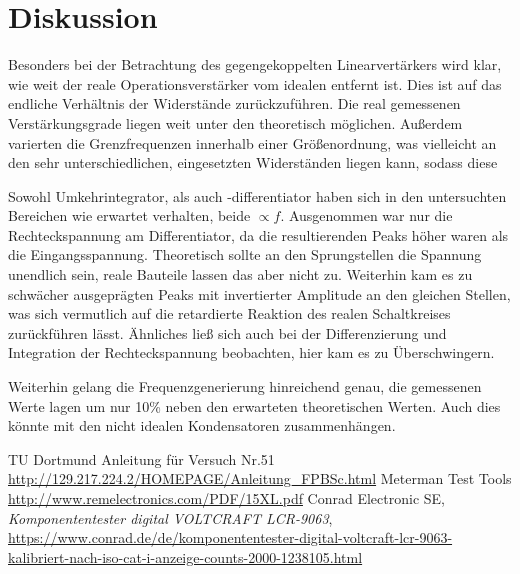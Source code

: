 \section{Diskussion}
Besonders bei der Betrachtung des gegengekoppelten Linearvertärkers wird klar, wie weit der reale Operationsverstärker vom idealen entfernt ist. Dies ist auf das endliche Verhältnis der Widerstände zurückzuführen. Die real gemessenen Verstärkungsgrade liegen weit unter den theoretisch möglichen. Außerdem varierten die Grenzfrequenzen innerhalb einer Größenordnung, was vielleicht an den sehr unterschiedlichen, eingesetzten Widerständen liegen kann, sodass diese 

Sowohl Umkehrintegrator, als auch -differentiator haben sich in den untersuchten Bereichen wie erwartet verhalten, beide $\propto f$. Ausgenommen war nur die Rechteckspannung am Differentiator, da die resultierenden Peaks höher waren als die Eingangsspannung. Theoretisch sollte an den Sprungstellen die Spannung unendlich sein, reale Bauteile lassen das aber nicht zu. Weiterhin kam es zu schwächer ausgeprägten Peaks mit invertierter Amplitude an den gleichen Stellen, was sich vermutlich auf die retardierte Reaktion des realen Schaltkreises zurückführen lässt. Ähnliches ließ sich auch bei der Differenzierung und Integration der Rechteckspannung beobachten, hier kam es zu Überschwingern.

Weiterhin gelang die Frequenzgenerierung hinreichend genau, die gemessenen Werte lagen um nur 10\% neben den erwarteten theoretischen Werten. Auch dies könnte mit den nicht idealen Kondensatoren zusammenhängen. 

\newpage
 \begin{thebibliography}{WissOnl}
 	 TU Dortmund Anleitung für Versuch Nr.51 \url{http://129.217.224.2/HOMEPAGE/Anleitung_FPBSc.html}
 	 Meterman Test Tools \url{http://www.remelectronics.com/PDF/15XL.pdf}
 	 Conrad Electronic SE, \textit{Komponententester digital VOLTCRAFT LCR-9063}, \url{https://www.conrad.de/de/komponententester-digital-voltcraft-lcr-9063-kalibriert-nach-iso-cat-i-anzeige-counts-2000-1238105.html}
 	\end{thebibliography}




